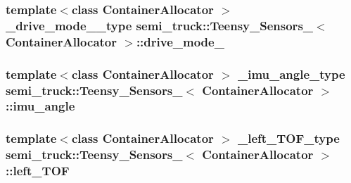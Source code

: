 \subsubsection[{\texorpdfstring{drive\+\_\+mode\+\_\+2}{drive_mode_2}}]{\setlength{\rightskip}{0pt plus 5cm}template$<$class Container\+Allocator $>$ {\bf \+\_\+drive\+\_\+mode\+\_\+\_\+type} {\bf semi\+\_\+truck\+::\+Teensy\+\_\+\+Sensors\+\_\+}$<$ Container\+Allocator $>$\+::drive\+\_\+mode\+\_}\hypertarget{structsemi__truck_1_1_teensy___sensors___a199ab1bba03a7b86615cc5a5aa197557}{}\label{structsemi__truck_1_1_teensy___sensors___a199ab1bba03a7b86615cc5a5aa197557}
\subsubsection[{\texorpdfstring{imu\+\_\+angle}{imu_angle}}]{\setlength{\rightskip}{0pt plus 5cm}template$<$class Container\+Allocator $>$ {\bf \+\_\+imu\+\_\+angle\+\_\+type} {\bf semi\+\_\+truck\+::\+Teensy\+\_\+\+Sensors\+\_\+}$<$ Container\+Allocator $>$\+::imu\+\_\+angle}\hypertarget{structsemi__truck_1_1_teensy___sensors___a329db78dcc3e9b42a390c48fdf99784e}{}\label{structsemi__truck_1_1_teensy___sensors___a329db78dcc3e9b42a390c48fdf99784e}
\subsubsection[{\texorpdfstring{left\+\_\+\+T\+OF}{left_TOF}}]{\setlength{\rightskip}{0pt plus 5cm}template$<$class Container\+Allocator $>$ {\bf \+\_\+left\+\_\+\+T\+O\+F\+\_\+type} {\bf semi\+\_\+truck\+::\+Teensy\+\_\+\+Sensors\+\_\+}$<$ Container\+Allocator $>$\+::left\+\_\+\+T\+OF}\hypertarget{structsemi__truck_1_1_teensy___sensors___a202e466979b2978e09428a512337433f}{}\label{structsemi__truck_1_1_teensy___sensors___a202e466979b2978e09428a512337433f}
